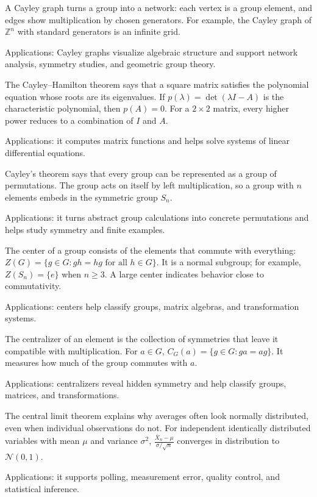A Cayley graph turns a group into a network: each vertex is a group element, and edges show multiplication by chosen generators. For example, the Cayley graph of $\mathbb Z^n$ with standard generators is an infinite grid. \par\noindent Applications: Cayley graphs visualize algebraic structure and support network analysis, symmetry studies, and geometric group theory.

The Cayley--Hamilton theorem says that a square matrix satisfies the polynomial equation whose roots are its eigenvalues. If $p(\lambda)=\det(\lambda I-A)$ is the characteristic polynomial, then $p(A)=0$. For a $2\times2$ matrix, every higher power reduces to a combination of $I$ and $A$. \par\noindent Applications: it computes matrix functions and helps solve systems of linear differential equations.

Cayley's theorem says that every group can be represented as a group of permutations. The group acts on itself by left multiplication, so a group with $n$ elements embeds in the symmetric group $S_n$. \par\noindent Applications: it turns abstract group calculations into concrete permutations and helps study symmetry and finite examples.

The center of a group consists of the elements that commute with everything: $Z(G)=\{g\in G:gh=hg\text{ for all }h\in G\}$. It is a normal subgroup; for example, $Z(S_n)=\{e\}$ when $n\ge3$. A large center indicates behavior close to commutativity. \par\noindent Applications: centers help classify groups, matrix algebras, and transformation systems.

The centralizer of an element is the collection of symmetries that leave it compatible with multiplication. For $a\in G$, $C_G(a)=\{g\in G:ga=ag\}$. It measures how much of the group commutes with $a$. \par\noindent Applications: centralizers reveal hidden symmetry and help classify groups, matrices, and transformations.

The central limit theorem explains why averages often look normally distributed, even when individual observations do not. For independent identically distributed variables with mean $\mu$ and variance $\sigma^2$, $\frac{\bar X_n-\mu}{\sigma/\sqrt n}$ converges in distribution to $\mathcal N(0,1)$. \par\noindent Applications: it supports polling, measurement error, quality control, and statistical inference.


